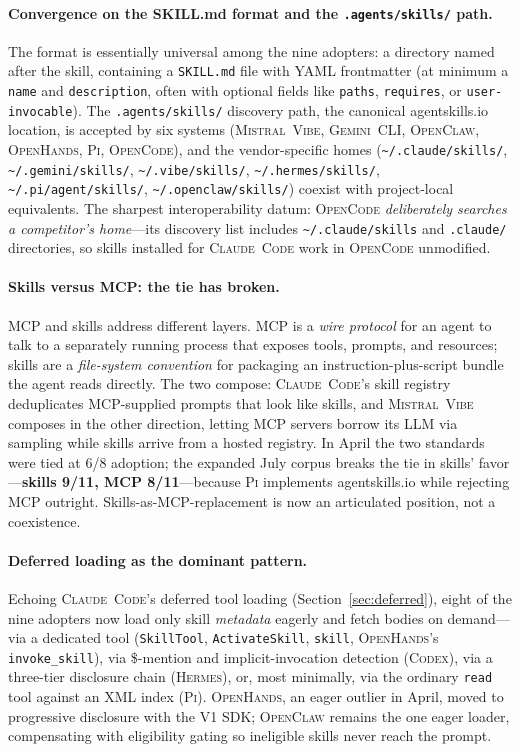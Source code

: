 \documentclass[11pt,a4paper]{article}
\newcommand{\clcode}{\textsc{Claude~Code}\xspace}
\newcommand{\cdx}{\textsc{Codex}\xspace}
\newcommand{\oh}{\textsc{OpenHands}\xspace}
\newcommand{\ocl}{\textsc{OpenClaw}\xspace}
\newcommand{\vibe}{\textsc{Mistral~Vibe}\xspace}
\newcommand{\gemini}{\textsc{Gemini~CLI}\xspace}
\newcommand{\hrm}{\textsc{Hermes}\xspace}
\newcommand{\pib}{\textsc{Pi}\xspace}
\newcommand{\ocd}{\textsc{OpenCode}\xspace}
\begin{document}
\paragraph{Convergence on the SKILL.md format and the \texttt{.agents/skills/} path.}
The format is essentially universal among the nine adopters: a directory named after the skill, containing a \texttt{SKILL.md} file with YAML frontmatter (at minimum a \texttt{name} and \texttt{description}, often with optional fields like \texttt{paths}, \texttt{requires}, or \texttt{user-invocable}).
The \texttt{.agents/skills/} discovery path, the canonical agentskills.io location, is accepted by six systems (\vibe{}, \gemini{}, \ocl{}, \oh{}, \pib{}, \ocd{}), and the vendor-specific homes (\texttt{\textasciitilde/.claude/skills/}, \texttt{\textasciitilde/.gemini/skills/}, \texttt{\textasciitilde/.vibe/skills/}, \texttt{\textasciitilde/.hermes/skills/}, \texttt{\textasciitilde/.pi/agent/skills/}, \texttt{\textasciitilde/.openclaw/skills/}) coexist with project-local equivalents.
The sharpest interoperability datum: \ocd{} \emph{deliberately searches a competitor's home}---its discovery list includes \texttt{\textasciitilde/.claude/skills} and \texttt{.claude/} directories, so skills installed for \clcode{} work in \ocd{} unmodified.

\paragraph{Skills versus MCP: the tie has broken.}
MCP and skills address different layers.
MCP is a \emph{wire protocol} for an agent to talk to a separately running process that exposes tools, prompts, and resources; skills are a \emph{file-system convention} for packaging an instruction-plus-script bundle the agent reads directly.
The two compose: \clcode{}'s skill registry deduplicates MCP-supplied prompts that look like skills, and \vibe{} composes in the other direction, letting MCP servers borrow its LLM via sampling while skills arrive from a hosted registry.
In April the two standards were tied at 6/8 adoption; the expanded July corpus breaks the tie in skills' favor---\textbf{skills 9/11, MCP 8/11}---because \pib{} implements agentskills.io while rejecting MCP outright.
Skills-as-MCP-replacement is now an articulated position, not a coexistence.

\paragraph{Deferred loading as the dominant pattern.}
Echoing \clcode{}'s deferred tool loading (Section~\ref{sec:deferred}), eight of the nine adopters now load only skill \emph{metadata} eagerly and fetch bodies on demand---via a dedicated tool (\texttt{SkillTool}, \texttt{ActivateSkill}, \texttt{skill}, \oh{}'s \texttt{invoke\_skill}), via \$-mention and implicit-invocation detection (\cdx{}), via a three-tier disclosure chain (\hrm{}), or, most minimally, via the ordinary \texttt{read} tool against an XML index (\pib{}).
\oh{}, an eager outlier in April, moved to progressive disclosure with the V1 SDK; \ocl{} remains the one eager loader, compensating with eligibility gating so ineligible skills never reach the prompt.
\end{document}

